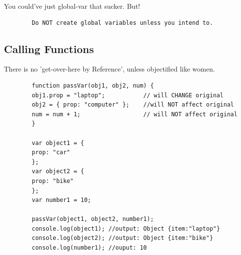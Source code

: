 \documentclass[11pt]{article}
\begin{document}
    You could've just global-var that sucker. But!
    \begin{verbatim}
        Do NOT create global variables unless you intend to.
    \end{verbatim}

    \subsection{Calling Functions}
    There is no 'get-over-here by Reference', unless objectified like women.
    \begin{verbatim}
        function passVar(obj1, obj2, num) {
        obj1.prop = "laptop";           // will CHANGE original
        obj2 = { prop: "computer" };    //will NOT affect original
        num = num + 1;                  // will NOT affect original
        }

        var object1 = {
        prop: "car"
        };
        var object2 = {
        prop: "bike"
        };
        var number1 = 10;

        passVar(object1, object2, number1);
        console.log(object1); //output: Object {item:"laptop"}
        console.log(object2); //output: Object {item:"bike"}
        console.log(number1); //ouput: 10
    \end{verbatim}
\end{document}
